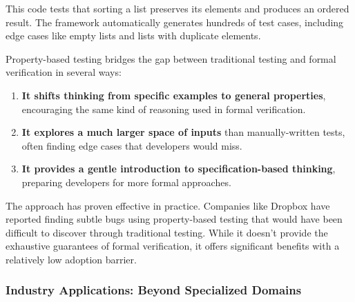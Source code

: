 \documentclass[11pt]{article}
\begin{document}
\begin{enumerate}
This code tests that sorting a list preserves its elements and produces an ordered result. The framework automatically generates hundreds of test cases, including edge cases like empty lists and lists with duplicate elements.

Property-based testing bridges the gap between traditional testing and formal verification in several ways:

\begin{enumerate}
\item \textbf{It shifts thinking from specific examples to general properties}, encouraging the same kind of reasoning used in formal verification.

\item \textbf{It explores a much larger space of inputs} than manually-written tests, often finding edge cases that developers would miss.

\item \textbf{It provides a gentle introduction to specification-based thinking}, preparing developers for more formal approaches.
\end{enumerate}

The approach has proven effective in practice. Companies like Dropbox have reported finding subtle bugs using property-based testing that would have been difficult to discover through traditional testing. While it doesn't provide the exhaustive guarantees of formal verification, it offers significant benefits with a relatively low adoption barrier.
\end{enumerate}
\subsubsection{Industry Applications: Beyond Specialized Domains}
\label{sec:org78d05af}
\end{document}
